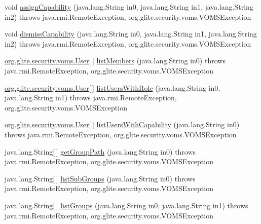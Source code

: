 \begin{DoxyCompactItemize}
void \hyperlink{classorg_1_1glite_1_1security_1_1voms_1_1service_1_1admin_1_1VOMSAdminSoapBindingImpl_aae7c7253c7d23ba1ed8cfcabd24df61d}{assignCapability} (java.lang.String in0, java.lang.String in1, java.lang.String in2)  throws java.rmi.RemoteException, org.glite.security.voms.VOMSException 
\item 
void \hyperlink{classorg_1_1glite_1_1security_1_1voms_1_1service_1_1admin_1_1VOMSAdminSoapBindingImpl_a26d68912087d40015ef0c9422aeef0ef}{dismissCapability} (java.lang.String in0, java.lang.String in1, java.lang.String in2)  throws java.rmi.RemoteException, org.glite.security.voms.VOMSException 
\item 
\hyperlink{classorg_1_1glite_1_1security_1_1voms_1_1User}{org.glite.security.voms.User}\mbox{[}$\,$\mbox{]} \hyperlink{classorg_1_1glite_1_1security_1_1voms_1_1service_1_1admin_1_1VOMSAdminSoapBindingImpl_ab2b385db9a83f447d5ab595741e56060}{listMembers} (java.lang.String in0)  throws java.rmi.RemoteException, org.glite.security.voms.VOMSException 
\item 
\hyperlink{classorg_1_1glite_1_1security_1_1voms_1_1User}{org.glite.security.voms.User}\mbox{[}$\,$\mbox{]} \hyperlink{classorg_1_1glite_1_1security_1_1voms_1_1service_1_1admin_1_1VOMSAdminSoapBindingImpl_a567e90cc58557b6fd0c5239faf6bbbe9}{listUsersWithRole} (java.lang.String in0, java.lang.String in1)  throws java.rmi.RemoteException, org.glite.security.voms.VOMSException 
\item 
\hyperlink{classorg_1_1glite_1_1security_1_1voms_1_1User}{org.glite.security.voms.User}\mbox{[}$\,$\mbox{]} \hyperlink{classorg_1_1glite_1_1security_1_1voms_1_1service_1_1admin_1_1VOMSAdminSoapBindingImpl_a2928f65a06fb8a726ff8572854deb902}{listUsersWithCapability} (java.lang.String in0)  throws java.rmi.RemoteException, org.glite.security.voms.VOMSException 
\item 
java.lang.String\mbox{[}$\,$\mbox{]} \hyperlink{classorg_1_1glite_1_1security_1_1voms_1_1service_1_1admin_1_1VOMSAdminSoapBindingImpl_af0c3d65f192d20c9f26cbf2286b9e724}{getGroupPath} (java.lang.String in0)  throws java.rmi.RemoteException, org.glite.security.voms.VOMSException 
\item 
java.lang.String\mbox{[}$\,$\mbox{]} \hyperlink{classorg_1_1glite_1_1security_1_1voms_1_1service_1_1admin_1_1VOMSAdminSoapBindingImpl_a9696308e5df3214d6eaaae12b677f43f}{listSubGroups} (java.lang.String in0)  throws java.rmi.RemoteException, org.glite.security.voms.VOMSException 
\item 
java.lang.String\mbox{[}$\,$\mbox{]} \hyperlink{classorg_1_1glite_1_1security_1_1voms_1_1service_1_1admin_1_1VOMSAdminSoapBindingImpl_a54825a0fb0c15015461d3ba35b89cac7}{listGroups} (java.lang.String in0, java.lang.String in1)  throws java.rmi.RemoteException, org.glite.security.voms.VOMSException 

\end{DoxyCompactItemize}
